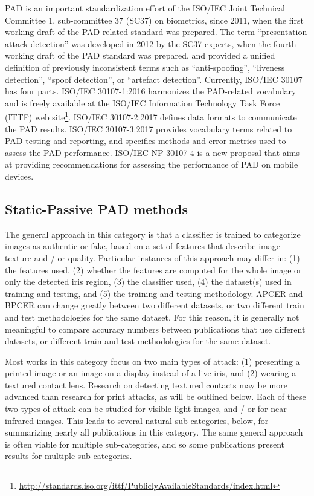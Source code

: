 \documentclass[format=acmsmall, review=false, timestamp=false]{acmart}
\begin{document}
PAD is {an important standardization effort} of the ISO/IEC Joint Technical Committee 1, sub-committee 37 (SC37) on biometrics, since 2011, when the first working draft of the PAD-related standard was prepared. The term ``presentation attack detection'' was developed in 2012 by the SC37 experts, when the fourth working draft of the PAD standard was prepared, and provided a unified definition of previously inconsistent terms such as ``anti-spoofing'', ``liveness detection'', ``spoof detection'', or ``{artefact} detection''. Currently, ISO/IEC 30107 {has four parts}. ISO/IEC 30107-1:2016 harmonizes the PAD-related vocabulary and is freely available at the ISO/IEC Information Technology Task Force (ITTF) web site\footnote{\url{http://standards.iso.org/ittf/PubliclyAvailableStandards/index.html}}. ISO/IEC 30107-2:2017 defines data formats to communicate the PAD results. ISO/IEC 30107-3:2017 provides vocabulary terms related to PAD testing and reporting, and specifies methods and error metrics used to assess the PAD performance. ISO/IEC NP 30107-4 is a new proposal that aims at providing recommendations for assessing the performance of PAD {on} mobile devices.



\subsection{Static-Passive PAD methods}
\label{sec:PADmethods_StaticPassive}

The general approach in this category is that a classifier is trained to categorize images as {authentic} or {fake}, based on a set of features that describe image texture and / or quality. Particular instances of this approach may differ in: (1) the features used, (2) whether the features are computed for the whole image or only the detected iris region, (3) the classifier used, (4) the dataset(s) used in training and testing, and (5) the training and testing methodology. {APCER and BPCER} can change greatly between two different datasets, or two different train and test methodologies for the same dataset. For this reason, it is generally not meaningful to compare accuracy numbers between publications that use different datasets, or different train and test methodologies for the same dataset. 

Most works in this category focus on two main types of attack: (1) presenting a printed image or an image on a display instead of a live iris, and (2) wearing a textured contact lens. Research on detecting textured contacts may be more advanced than research for print attacks, as will be outlined below. Each of these two types of attack can be studied for visible-light images, and / or for near-{infrared} images. This leads to {several} natural sub-categories, below, for summarizing nearly all publications in this category. The same general approach is often viable for multiple sub-categories, and so some publications present results for multiple sub-categories.
\end{document}
